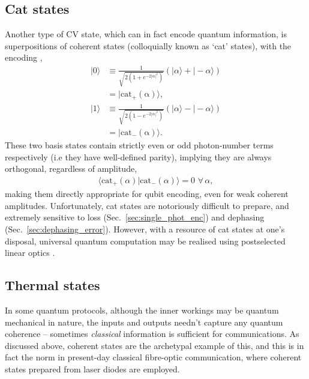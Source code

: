 \documentclass[aps,rmp,twocolumn,amsmath,amssymb,nofootinbib,superscriptaddress,longbibliography,floatfix]{revtex4-1}
\newcommand{\ket}[1]{|#1\rangle}
\begin{document}
%
%

\subsection{Cat states} \label{sec:cat_enc}

Another type of CV state, which can in fact encode quantum information, is superpositions of coherent states (colloquially known as `cat' states), with the encoding \cite{???},
\begin{align}
\ket{0} &\equiv \frac{1}{\sqrt{2(1+e^{-2|\alpha|^2})}} (\ket{\alpha}+\ket{-\alpha}) \nonumber \\
&= \ket{\mathrm{cat_+(\alpha)}},\nonumber \\
\ket{1} &\equiv \frac{1}{\sqrt{2(1-e^{-2|\alpha|^2})}}(\ket{\alpha}-\ket{-\alpha}) \nonumber \\
&= \ket{\mathrm{cat_-(\alpha)}}.
\end{align}
These two basis states contain strictly even or odd photon-number terms respectively (i.e they have well-defined parity), implying they are always orthogonal, regardless of amplitude,
\begin{align}
\langle\mathrm{cat}_+(\alpha)|\mathrm{cat}_-(\alpha)\rangle = 0 \,\,\forall\,\alpha,
\end{align}
making them directly appropriate for qubit encoding, even for weak coherent amplitudes. Unfortunately, cat states are notoriously difficult to prepare, and extremely sensitive to loss (Sec.~\ref{sec:single_phot_enc}) and dephasing (Sec.~\ref{sec:dephasing_error}). However, with a resource of cat states at one's disposal, universal quantum computation may be realised using postselected linear optics \cite{bib:JeongRalph05, bib:Gilchrist04}.

%
%

\subsection{Thermal states}

In some quantum protocols, although the inner workings may be quantum mechanical in nature, the inputs and outputs needn't capture any quantum coherence -- sometimes \emph{classical} information is sufficient for communications. As discussed above, coherent states are the archetypal example of this, and this is in fact the norm in present-day classical fibre-optic communication, where coherent states prepared from laser diodes are employed.
\end{document}
